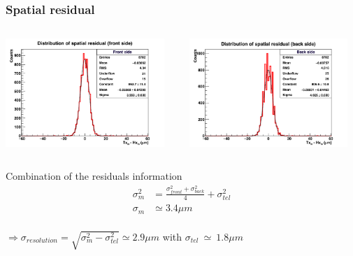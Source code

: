 \documentclass{beamer}
\begin{document}
\begin{frame}[plain]
    \frametitle{Spatial residual}
    
    \vspace{-0.2cm}

    \vspace{-0.65cm}
    \begin{columns}[t]
        \begin{column}{6cm}
            \begin{center}
                \includegraphics[width = 6cm]{Pictures/hxtxFront_226056.png}
            \end{center}
        \end{column}
        \begin{column}{6cm}
            \begin{center}
                \includegraphics[width = 6cm]{Pictures/hxtxBack_226056.png}
            \end{center}
        \end{column}
    \end{columns}

    \vspace{-0.2cm}
    \begin{block}{Combination of the residuals information}
      \[
        \begin{array}{rl}
            \sigma_m^2 &= \frac{\sigma^2_{front} + \sigma^2_{back}}{4} + \sigma^2_{tel} \\
            \sigma_m &\simeq 3.4 \mu m \\
        \end{array}
      \]
      \begin{center}
            $ \Rightarrow \sigma_{resolution} = \sqrt{\sigma^2_{m} - \sigma^2_{tel}} \simeq 2.9 \mu m $
            with $\sigma_{tel} \ \simeq \ 1.8 \mu m$
      \end{center}
    \end{block}
\end{frame}
\end{document}
